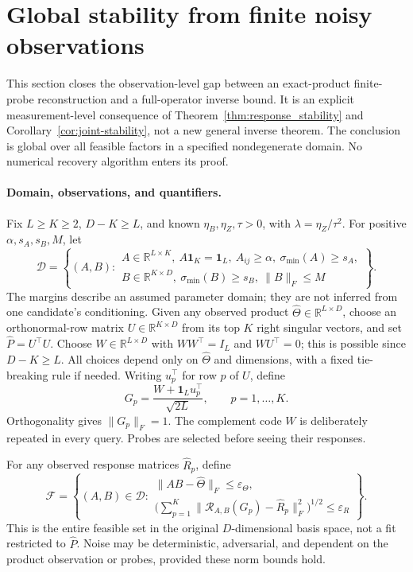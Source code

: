 \section{Global stability from finite noisy observations}
\label{app:finite-noisy}

This section closes the observation-level gap between an exact-product
finite-probe reconstruction and a full-operator inverse bound.
It is an explicit measurement-level consequence of
Theorem~\ref{thm:response_stability} and
Corollary~\ref{cor:joint-stability}, not a new general inverse theorem.
The conclusion is global over all feasible factors in a specified
nondegenerate domain. No numerical recovery algorithm enters its proof.

\paragraph{Domain, observations, and quantifiers.}
Fix $L\ge K\ge2$, $D-K\ge L$, and known
$\eta_B,\eta_Z,\tau>0$, with $\lambda=\eta_Z/\tau^2$.
For positive $\alpha,s_A,s_B,M$, let
\[
 \mathcal D=\left\{(A,B):
 \begin{array}{l}
 A\in\mathbb R^{L\times K},\ A\mathbf1_K=\mathbf1_L,\
 A_{ij}\ge\alpha,\ \sigma_{\min}(A)\ge s_A,\\
 B\in\mathbb R^{K\times D},\
 \sigma_{\min}(B)\ge s_B,\ \|B\|_F\le M
 \end{array}\right\}.
\]
The margins describe an assumed parameter domain; they are not inferred
from one candidate's conditioning.
Given any observed product $\widehat\Theta\in\mathbb R^{L\times D}$,
choose an orthonormal-row matrix $U\in\mathbb R^{K\times D}$ from its top
$K$ right singular vectors, and set $\widehat P=U^\top U$.
Choose $W\in\mathbb R^{L\times D}$ with
$WW^\top=I_L$ and $WU^\top=0$; this is possible since $D-K\ge L$.
All choices depend only on $\widehat\Theta$ and dimensions, with a fixed
tie-breaking rule if needed. Writing $u_p^\top$ for row $p$ of $U$, define
\begin{equation}
 G_p=\frac{W+\mathbf1_Lu_p^\top}{\sqrt{2L}},
 \qquad p=1,\ldots,K.
 \label{eq:finite-noisy-probes}
\end{equation}
Orthogonality gives $\|G_p\|_F=1$. The complement code $W$ is deliberately
repeated in every query. Probes are selected before seeing their responses.

For any observed response matrices $\widehat R_p$, define
\begin{equation}
 \mathcal F=\left\{(A,B)\in\mathcal D:
 \begin{array}{l}
 \|AB-\widehat\Theta\|_F\le\varepsilon_\Theta,\\
 \bigl(\sum_{p=1}^K
 \|\mathcal R_{A,B}(G_p)-\widehat R_p\|_F^2\bigr)^{1/2}
 \le\varepsilon_R
 \end{array}\right\}.
 \label{eq:finite-noisy-feasible}
\end{equation}
This is the entire feasible set in the original $D$-dimensional basis
space, not a fit restricted to $\widehat P$.
Noise may be deterministic, adversarial, and dependent on the product
observation or probes, provided these norm bounds hold.

